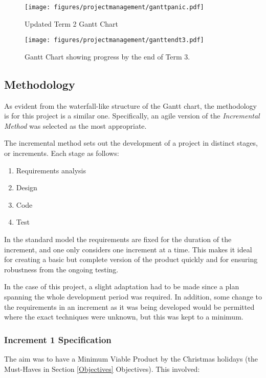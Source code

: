 \documentclass{article}
\begin{document}
\begin{figure}
    \texttt{[image: figures/projectmanagement/ganttpanic.pdf]}
        \caption{Updated Term 2 Gantt Chart}
        \label{fig:gantt2}
\end{figure}

\begin{figure}
    \texttt{[image: figures/projectmanagement/ganttendt3.pdf]}
        \caption{Gantt Chart showing progress by the end of Term 3.}
        \label{fig:gantt3}
\end{figure}

\subsection{Methodology}
\label{methodology}
As evident from the waterfall-like structure of the Gantt chart, the methodology is for this project is a similar one. Specifically, an agile version of the \textit{Incremental Method} \cite{management:incremental} was selected as the most appropriate. 

The incremental method sets out the development of a project in distinct stages, or increments. Each stage as follows:
\begin{enumerate}
    \item Requirements analysis
    \item Design
    \item Code 
    \item Test
\end{enumerate}
In the standard model the requirements are fixed for the duration of the increment, and one only considers one increment at a time. This makes it ideal for creating a basic but complete version of the product quickly and for ensuring robustness from the ongoing testing. 

In the case of this project, a slight adaptation had to be made since a plan spanning the whole development period was required. In addition, some change to the requirements in an increment as it was being developed would be permitted where the exact techniques were unknown, but this was kept to a minimum.  

\subsubsection{Increment 1 Specification}
The aim was to have a Minimum Viable Product by the Christmas holidays (the Must-Haves in Section \ref{Objectives} Objectives). This involved:
\end{document}
